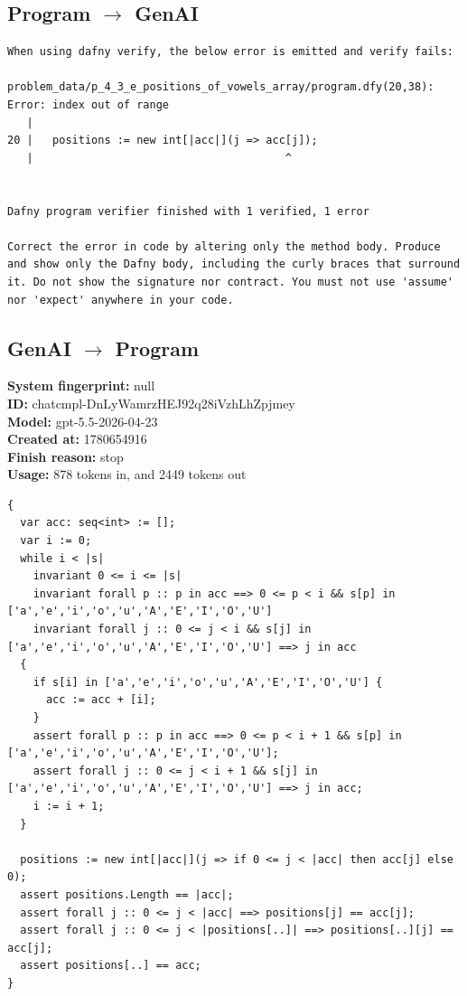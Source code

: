 \documentclass{article}
\begin{document}
\subsection*{Program $\rightarrow$ GenAI}
\begin{lstlisting}
When using dafny verify, the below error is emitted and verify fails:

problem_data/p_4_3_e_positions_of_vowels_array/program.dfy(20,38): Error: index out of range
   |
20 |   positions := new int[|acc|](j => acc[j]);
   |                                       ^


Dafny program verifier finished with 1 verified, 1 error

Correct the error in code by altering only the method body. Produce and show only the Dafny body, including the curly braces that surround it. Do not show the signature nor contract. You must not use 'assume' nor 'expect' anywhere in your code.
\end{lstlisting}
\subsection*{GenAI $\rightarrow$ Program}
\textbf{System fingerprint: }null
\\\textbf{ID: }chatcmpl-DnLyWamrzHEJ92q28iVzhLhZpjmey
\\\textbf{Model: }gpt-5.5-2026-04-23
\\\textbf{Created at: }1780654916
\\\textbf{Finish reason: }stop
\\\textbf{Usage: }878 tokens in, and 2449 tokens out
\begin{lstlisting}
{
  var acc: seq<int> := [];
  var i := 0;
  while i < |s|
    invariant 0 <= i <= |s|
    invariant forall p :: p in acc ==> 0 <= p < i && s[p] in ['a','e','i','o','u','A','E','I','O','U']
    invariant forall j :: 0 <= j < i && s[j] in ['a','e','i','o','u','A','E','I','O','U'] ==> j in acc
  {
    if s[i] in ['a','e','i','o','u','A','E','I','O','U'] {
      acc := acc + [i];
    }
    assert forall p :: p in acc ==> 0 <= p < i + 1 && s[p] in ['a','e','i','o','u','A','E','I','O','U'];
    assert forall j :: 0 <= j < i + 1 && s[j] in ['a','e','i','o','u','A','E','I','O','U'] ==> j in acc;
    i := i + 1;
  }

  positions := new int[|acc|](j => if 0 <= j < |acc| then acc[j] else 0);
  assert positions.Length == |acc|;
  assert forall j :: 0 <= j < |acc| ==> positions[j] == acc[j];
  assert forall j :: 0 <= j < |positions[..]| ==> positions[..][j] == acc[j];
  assert positions[..] == acc;
}
\end{lstlisting}
\end{document}
